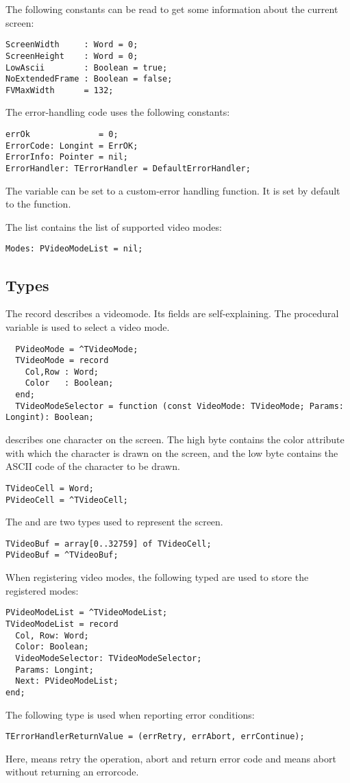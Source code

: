 The following constants can be read to get some information about the
current screen:
\begin{verbatim}
ScreenWidth     : Word = 0;
ScreenHeight    : Word = 0;
LowAscii        : Boolean = true;
NoExtendedFrame : Boolean = false;
FVMaxWidth      = 132;
\end{verbatim}
The error-handling code uses the following constants:
\begin{verbatim}
errOk              = 0;
ErrorCode: Longint = ErrOK;
ErrorInfo: Pointer = nil;
ErrorHandler: TErrorHandler = DefaultErrorHandler;
\end{verbatim}
The  variable can be set to a custom-error handling
function. It is set by default to the  function.

The  list contains the list of supported video modes:
\begin{verbatim}
Modes: PVideoModeList = nil;
\end{verbatim}

\subsection{Types}
The  record describes a videomode. Its fields are
self-explaining. The  procedural variable
is used to select a video mode.
\begin{verbatim}
  PVideoMode = ^TVideoMode;
  TVideoMode = record
    Col,Row : Word;
    Color   : Boolean;
  end;
  TVideoModeSelector = function (const VideoMode: TVideoMode; Params: Longint): Boolean;
\end{verbatim}
 describes one character on the screen. The high byte
contains the color attribute with which the character is drawn on the screen,
and the low byte contains the ASCII code of the character to be drawn.
\begin{verbatim}
TVideoCell = Word;
PVideoCell = ^TVideoCell;
\end{verbatim}
The  and  are two types used to represent the
screen.
\begin{verbatim}
TVideoBuf = array[0..32759] of TVideoCell;
PVideoBuf = ^TVideoBuf;
\end{verbatim}
When registering video modes, the following typed are used to store the
registered modes:
\begin{verbatim}
PVideoModeList = ^TVideoModeList;
TVideoModeList = record
  Col, Row: Word;
  Color: Boolean;
  VideoModeSelector: TVideoModeSelector;
  Params: Longint;
  Next: PVideoModeList;
end;
\end{verbatim}
The following type is used when reporting error conditions:
\begin{verbatim}
TErrorHandlerReturnValue = (errRetry, errAbort, errContinue);
\end{verbatim}
Here,  means retry the operation, 
abort and return error code and  means abort
without returning an errorcode.

